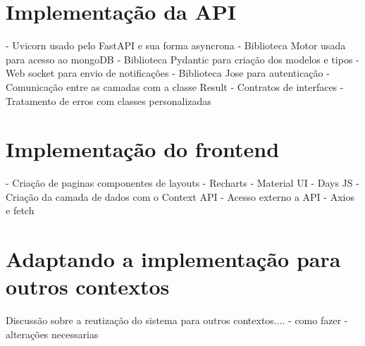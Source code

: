 \section[Implementação da API]{Implementação da API}
- Uvicorn usado pelo FastAPI e sua forma asyncrona
- Biblioteca Motor usada para acesso ao mongoDB
- Biblioteca Pydantic para criação dos modelos e tipos
- Web socket para envio de notificações
- Biblioteca Jose para autenticação
- Comunicação entre as camadas com a classe Result
- Contratos de interfaces
- Tratamento de erros com classes personalizadas


\section[Implementação do frontend]{Implementação do frontend}
- Criação de paginas componentes de layouts
- Recharts
- Material UI
- Days JS
- Criação da camada de dados com o Context API
- Acesso externo a API
- Axios e fetch

\section[Adaptando a implementação para outros contextos]{Adaptando a implementação para outros contextos}
Discussão sobre a reutização do sistema para outros contextos....
- como fazer
- alterações necessarias
